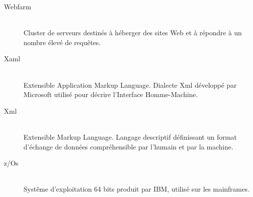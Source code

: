 \documentclass[a4paper,french,8pt]{article}
\begin{document}
\begin{description}
			\item[Webfarm] \hfill \\
				Cluster de serveurs destinés à héberger des sites Web et à répondre à un nombre élevé de requêtes.
			\item[Xaml] \hfill \\
				Extensible Application Markup Language. Dialecte Xml développé par Microsoft utilisé pour décrire l'Interface Homme-Machine.
			\item[Xml] \hfill \\
				Extensible Markup Language. Langage descriptif définissant un format d'échange de données compréhensible par l'humain et par la machine.
			\item[z/Os] \hfill \\
				Systême d'exploitation 64 bits produit par IBM, utilisé sur les mainframes.
			\end{description}
		
\end{document}
